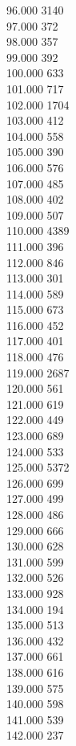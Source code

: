 { 96.000	3140 \\
 97.000	372 \\
 98.000	357 \\
 99.000	392 \\
 100.000	633 \\
 101.000	717 \\
 102.000	1704 \\
 103.000	412 \\
 104.000	558 \\
 105.000	390 \\
 106.000	576 \\
 107.000	485 \\
 108.000	402 \\
 109.000	507 \\
 110.000	4389 \\
 111.000	396 \\
 112.000	846 \\
 113.000	301 \\
 114.000	589 \\
 115.000	673 \\
 116.000	452 \\
 117.000	401 \\
 118.000	476 \\
 119.000	2687 \\
 120.000	561 \\
 121.000	619 \\
 122.000	449 \\
 123.000	689 \\
 124.000	533 \\
 125.000	5372 \\
 126.000	699 \\
 127.000	499 \\
 128.000	486 \\
 129.000	666 \\
 130.000	628 \\
 131.000	599 \\
 132.000	526 \\
 133.000	928 \\
 134.000	194 \\
 135.000	513 \\
 136.000	432 \\
 137.000	661 \\
 138.000	616 \\
 139.000	575 \\
 140.000	598 \\
 141.000	539 \\
 142.000	237 \\
}

